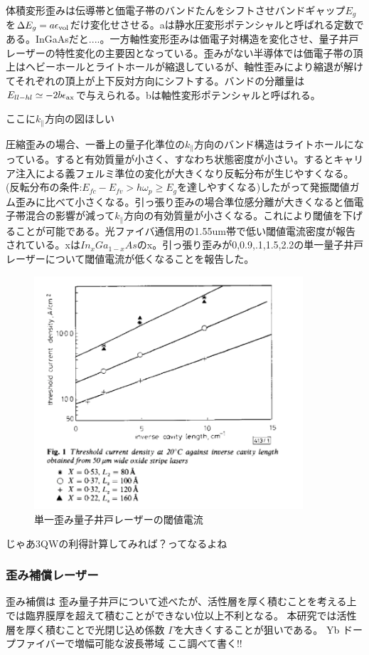 体積変形歪みは伝導帯と価電子帯のバンドたんをシフトさせバンドギャップ$E_{g}$を$\Delta E_{g}=a\epsilon_{\rm{vol}}$だけ変化せさせる。aは静水圧変形ポテンシャルと呼ばれる定数である。InGaAsだと....。一方軸性変形歪みは価電子対構造を変化させ、量子井戸レーザーの特性変化の主要因となっている。歪みがない半導体では価電子帯の頂上はヘビーホールとライトホールが縮退しているが、軸性歪みにより縮退が解けてそれぞれの頂上が上下反対方向にシフトする。バンドの分離量は$E_{ll-hl}\simeq -2b\epsilon_{\rm{ax}}$で与えられる。bは軸性変形ポテンシャルと呼ばれる。


ここに$k_{\|}$方向の図ほしい

圧縮歪みの場合、一番上の量子化準位の$k_{\|}$方向のバンド構造はライトホールになっている。すると有効質量が小さく、すなわち状態密度が小さい。するとキャリア注入による義フェルミ準位の変化が大きくなり反転分布が生じやすくなる。(反転分布の条件:$E_{fc}-E_{fv}>h\omega _{p}\geq E_{g}$を達しやすくなる)したがって発振閾値ガム歪みに比べて小さくなる。引っ張り歪みの場合準位感分離が大きくなると価電子帯混合の影響が減って$k_{\|}$方向の有効質量が小さくなる。これにより閾値を下げることが可能である。光ファイバ通信用の1.55um帯で低い閾値電流密度が報告されている。\cite{ref_thijs}xは$In_{x}Ga_{1-x}As$のx。引っ張り歪みが0,0.9,.1,1.5,2.2の単一量子井戸レーザーについて閾値電流が低くなることを報告した。

\begin{figure}[h]
	\centering
	\includegraphics[width=10cm]{figure/fig_1_1_lattice_strain_Ith.png}
	\caption{単一歪み量子井戸レーザーの閾値電流}
	\label{fig:fig_latice_strain_Ith}
\end{figure}

じゃあ3QWの利得計算してみれば？ってなるよね
\clearpage
\subsubsection{歪み補償レーザー}

歪み補償は\cite{ref_t_kawamura}
歪み量子井戸について述べたが、活性層を厚く積むことを考える上では臨界膜厚を超えて積むことができない位以上不利となる。
本研究では活性層を厚く積むことで光閉じ込め係数
$\Gamma$を大きくすることが狙いである。
Yb ドープファイバーで増幅可能な波長帯域
ここ調べて書く!!


